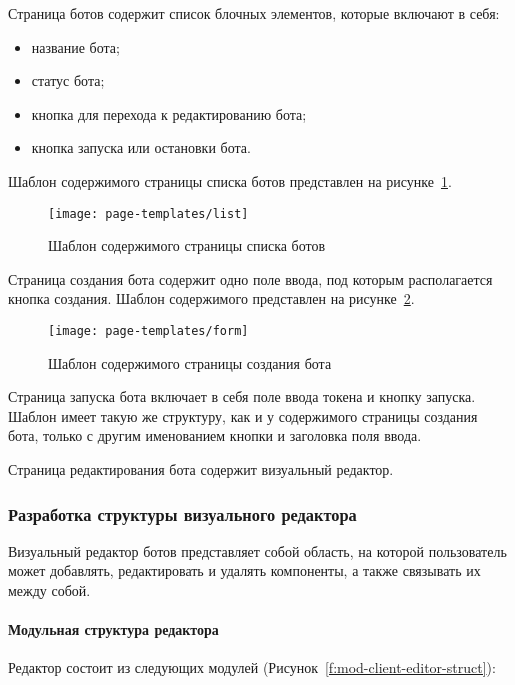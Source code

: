 Страница ботов содержит список блочных элементов, которые
включают в себя:
\begin{itemize}
	\item название бота;
	\item статус бота;
	\item кнопка для перехода к редактированию бота;
	\item кнопка запуска или остановки бота.
\end{itemize}

Шаблон содержимого страницы списка ботов представлен на
рисунке~\ref{f:list-template}.

\begin{figure}[ht]
	\centering
	\texttt{[image: page-templates/list]}
	\caption{Шаблон содержимого страницы списка ботов}
	\label{f:list-template}
\end{figure}

Страница создания бота содержит одно поле ввода, под которым
располагается кнопка создания. Шаблон содержимого представлен на
рисунке~\ref{f:form-template}.


\begin{figure}[ht]
	\centering
	\vspace{\toppaddingoffigure}
	\texttt{[image: page-templates/form]}
	\caption{Шаблон содержимого страницы создания бота}
	\label{f:form-template}
\end{figure}

Страница запуска бота включает в себя поле ввода токена и кнопку
запуска. Шаблон имеет такую же структуру, как и у содержимого страницы создания бота,
только с другим именованием кнопки и заголовка поля ввода.

Страница редактирования бота содержит визуальный редактор.

\subsubsection{Разработка структуры визуального редактора}

Визуальный редактор ботов представляет собой область, на которой
пользователь может добавлять, редактировать и удалять компоненты, а также
связывать их между собой.

\paragraph{Модульная структура редактора}


Редактор состоит из следующих модулей (Рисунок~\ref{f:mod-client-editor-struct}):

